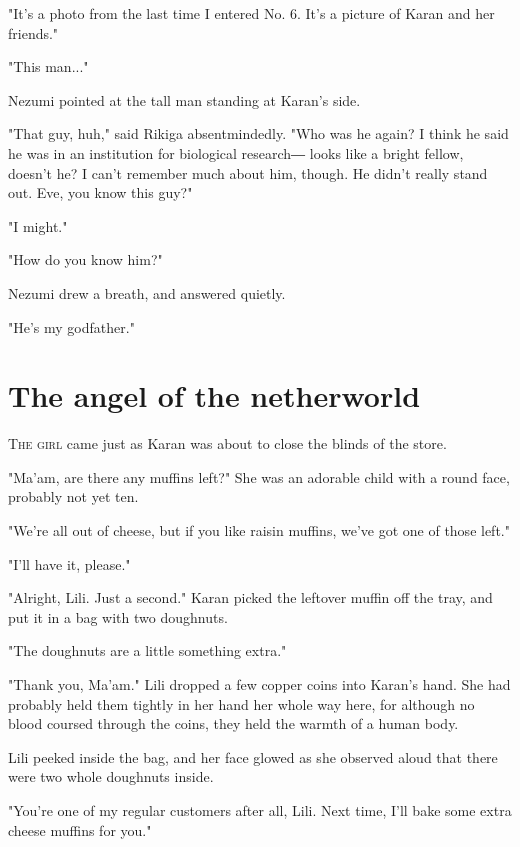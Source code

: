 "It's a photo from the last time I entered No. 6. It's a picture of
Karan and her friends."

"This man..."

Nezumi pointed at the tall man standing at Karan's side.

"That guy, huh," said Rikiga absentmindedly. "Who was he again? I think
he said he was in an institution for biological research― looks like a
bright fellow, doesn't he? I can't remember much about him, though. He
didn't really stand out. Eve, you know this guy?"

"I might."

"How do you know him?"

Nezumi drew a breath, and answered quietly.

"He's my godfather."

\chapter{The angel of the netherworld}


\lettrine{T}{he girl} came just as Karan was about to close the blinds of the store.

"Ma'am, are there any muffins left?" She was an adorable child with a
round face, probably not yet ten.

"We're all out of cheese, but if you like raisin muffins, we've got one
of those left."

"I'll have it, please."

"Alright, Lili. Just a second." Karan picked the leftover muffin off the
tray, and put it in a bag with two doughnuts.

"The doughnuts are a little something extra."

"Thank you, Ma'am." Lili dropped a few copper coins into Karan's hand.
She had probably held them tightly in her hand her whole way here, for
although no blood coursed through the coins, they held the warmth of a
human body.

Lili peeked inside the bag, and her face glowed as she observed aloud
that there were two whole doughnuts inside.

"You're one of my regular customers after all, Lili. Next time, I'll
bake some extra cheese muffins for you."

